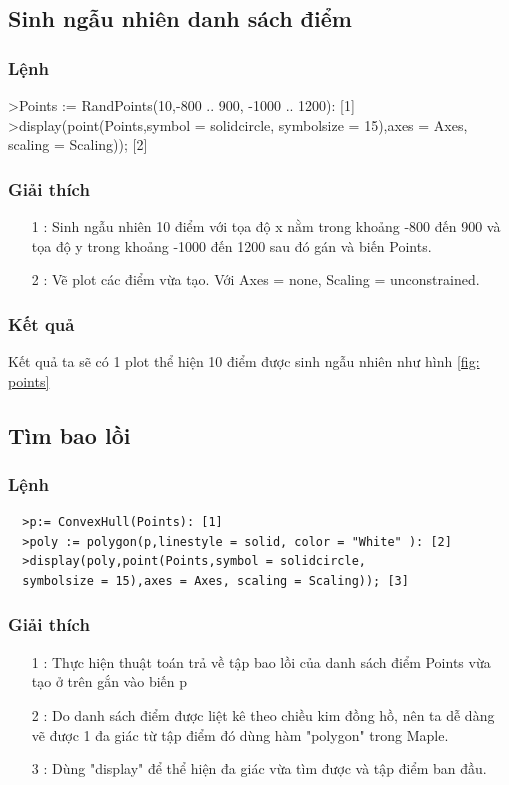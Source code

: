 \documentclass[12pt]{article}
\begin{document}
        \subsection*{Sinh ngẫu nhiên danh sách điểm}
          \subsubsection*{Lệnh}
            \begin{spverbatim}
    >Points := RandPoints(10,-800 .. 900, -1000 .. 1200): [1]
    >display(point(Points,symbol = solidcircle, 
    symbolsize = 15),axes = Axes, scaling = Scaling)); [2]
            \end{spverbatim}
          \subsubsection*{Giải thích}
            \begin{itemize}
              \item [1]: Sinh ngẫu nhiên 10 điểm với tọa độ x nằm trong khoảng -800 đến 900 và tọa độ y trong khoảng -1000 đến 1200 sau đó gán và biến Points.
              \item [2]: Vẽ plot các điểm vừa tạo. Với Axes = none, Scaling = unconstrained. 
            \end{itemize}
          \subsubsection*{Kết quả} 
            Kết quả ta sẽ có 1 plot thể hiện 10 điểm được sinh ngẫu nhiên như hình \ref{fig: points}
            \newpage
        \subsection*{Tìm bao lồi}
            \subsubsection*{Lệnh}
              \begin{verbatim}
  >p:= ConvexHull(Points): [1]
  >poly := polygon(p,linestyle = solid, color = "White" ): [2]
  >display(poly,point(Points,symbol = solidcircle, 
  symbolsize = 15),axes = Axes, scaling = Scaling)); [3]
              \end{verbatim}
            \subsubsection*{Giải thích}
              \begin{itemize}
                \item [1]: Thực hiện thuật toán trả về tập bao lồi của danh sách điểm Points vừa tạo ở trên gắn vào biến p
                \item [2]: Do danh sách điểm được liệt kê theo chiều kim đồng hồ, nên ta dễ dàng vẽ được 1 đa giác từ tập điểm đó dùng hàm "polygon" trong Maple.
                \item [3]: Dùng "display" để thể hiện đa giác vừa tìm được và tập điểm ban đầu.
              \end{itemize}
\end{document}
